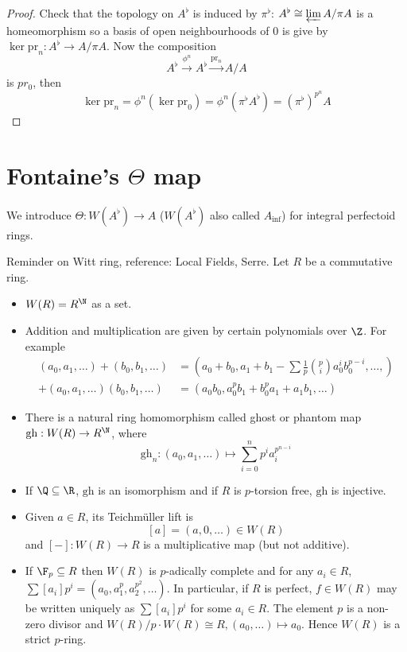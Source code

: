 \documentclass[a4paper]{article}
\newcommand{\tilt}{\flat} %
\begin{document}
\begin{proof}
  Check that the topology on \(A^\tilt\) is induced by \(\pi^\tilt\): \(A^\tilt \cong \varprojlim A/\pi A\) is a homeomorphism so a basis of open neighbourhoods of \(0\) is give by \(\ker \mathrm{pr}_n: A^\tilt \to A/\pi A\). Now the composition
  \[
    A^\tilt \xrightarrow{\phi^n} A^\tilt \xrightarrow{\mathrm{pr}_n} A/A
  \]
  is \(pr_0\), then
  \[
    \ker \mathrm{pr}_n = \phi^n (\ker \mathrm{pr}_0) = \phi^n (\pi^\tilt A^\tilt ) = (\pi^\tilt)^{p^n} A
  \]
\end{proof}

\section{Fontaine's \(\Theta\) map}

We introduce \(\Theta: W(A^\tilt) \to A\) (\(W(A^\tilt)\) also called \(A_{\mathrm{inf}}\)) for integral perfectoid rings.

\begin{remark}
  Reminder on Witt ring, reference: Local Fields, Serre. Let \(R\) be a commutative ring.
  \begin{itemize}
  \item \(W(R) = R^\N\) as a set.
  \item Addition and multiplication are given by certain polynomials over \(\Z\). For example
    \begin{align*}
      (a_0, a_1, \dots) + (b_0, b_1, \dots) &= (a_0 + b_0, a_1 + b_1 - \sum \frac{1}{p} \binom{p}{i} a_0^i b_0^{p - i}, \dots, ) \\
      +(a_0, a_1, \dots) (b_0, b_1, \dots) &= (a_0b_0, a_0^pb_1 + b_0^pa_1 + a_1b_1, \dots)
    \end{align*}
  \item There is a natural ring homomorphism called ghost or phantom map \(\mathrm{gh}: W(R) \to R^\N\), where
    \[
      \mathrm{gh}_n: (a_0, a_1, \dots) \mapsto \sum_{i = 0}^n p^i a_i^{p^{n - i}}
    \]
  \item If \(\Q \subseteq \R\), \(\mathrm{gh}\) is an isomorphism and if \(R\) is \(p\)-torsion free, \(\mathrm{gh}\) is injective.
  \item Given \(a \in R\), its Teichmüller lift is
    \[
      [a] = (a, 0, \dots) \in W(R)
    \]
    and \([-]: W(R) \to R\) is a multiplicative map (but not additive).
  \item If \(\F_p \subseteq R\) then \(W(R)\) is \(p\)-adically complete and for any \(a_i \in R\), \(\sum [a_i] p^i = (a_0, a_1^p, a_2^{p^2}, \dots)\). In particular, if \(R\) is perfect, \(f \in W(R)\) may be written uniquely as \(\sum [a_i] p^i\) for some \(a_i \in R\). The element \(p\) is a non-zero divisor and \(W(R)/p \cdot W(R) \cong R, (a_0, \dots) \mapsto a_0\). Hence \(W(R)\) is a strict \(p\)-ring.
  \end{itemize}
\end{remark}
\end{document}
